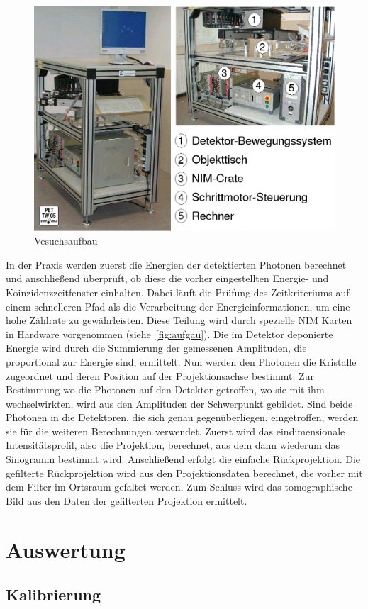 \documentclass[slug=PET, room=Andreas-Schubert-Bau\,\ 424A, supervisor=Carsten\ Bittrich, coursedate=10.\ 01.\ 2020]{../../Lab_Report_LaTeX/lab_report}
\begin{document}
\begin{figure}
 \includegraphics[width=.5\textwidth]{aufbau.png}
 \caption{Vesuchsaufbau}
 \label{fig:aufbau}
\end{figure}
In der Praxis werden zuerst die Energien der detektierten Photonen
berechnet und anschließend überprüft, ob diese die vorher
eingestellten Energie- und Koinzidenzzeitfenster einhalten. Dabei
l\"auft die Pr\"ufung des Zeitkriteriums auf einem schnelleren Pfad
als die Verarbeitung der Energieinformationen, um eine hohe Z\"ahlrate
zu gew\"ahrleisten. Diese Teilung wird durch spezielle NIM Karten in
Hardware vorgenommen (siehe~\ref{fig:aufgau}).  Die im Detektor
deponierte Energie wird durch die Summierung der gemessenen
Amplituden, die proportional zur Energie sind, ermittelt.  Nun werden
den Photonen die Kristalle zugeordnet und deren Position auf der
Projektionsachse bestimmt.  Zur Bestimmung wo die Photonen auf den
Detektor getroffen, wo sie mit ihm wechselwirkten, wird aus den
Amplituden der Schwerpunkt gebildet.  Sind beide Photonen in die
Detektoren, die sich genau gegenüberliegen, eingetroffen, werden sie
für die weiteren Berechnungen verwendet.  Zuerst wird das
eindimensionale Intensitätsprofil, also die Projektion, berechnet, aus
dem dann wiederum das Sinogramm bestimmt wird. Anschließend erfolgt
die einfache Rückprojektion.  Die gefilterte Rückprojektion wird aus
den Projektionsdaten berechnet, die vorher mit dem Filter im Ortsraum
gefaltet werden. Zum Schluss wird das tomographische Bild aus den
Daten der gefilterten Projektion ermittelt.

\section{Auswertung}
\label{sec:ausw}

\subsection{Kalibrierung}
\label{sec:kalib}
\end{document}
